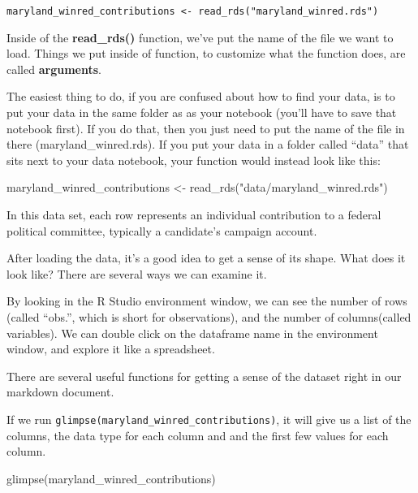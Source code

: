 \documentclass[
  letterpaper,
  DIV=11,
  numbers=noendperiod]{scrreprt}
\newenvironment{Shaded}{\begin{snugshade}}{\end{snugshade}}
\newcommand{\FunctionTok}[1]{\textcolor[rgb]{0.28,0.35,0.67}{#1}}
\newcommand{\NormalTok}[1]{\textcolor[rgb]{0.00,0.23,0.31}{#1}}
\newcommand{\OtherTok}[1]{\textcolor[rgb]{0.00,0.23,0.31}{#1}}
\newcommand{\StringTok}[1]{\textcolor[rgb]{0.13,0.47,0.30}{#1}}
\begin{document}
\texttt{maryland\_winred\_contributions\ \textless{}-\ read\_rds("maryland\_winred.rds")}

Inside of the \textbf{read\_rds()} function, we've put the name of the
file we want to load. Things we put inside of function, to customize
what the function does, are called \textbf{arguments}.

The easiest thing to do, if you are confused about how to find your
data, is to put your data in the same folder as as your notebook (you'll
have to save that notebook first). If you do that, then you just need to
put the name of the file in there (maryland\_winred.rds). If you put
your data in a folder called ``data'' that sits next to your data
notebook, your function would instead look like this:

\begin{Shaded}
\begin{Highlighting}[]
\NormalTok{maryland\_winred\_contributions }\OtherTok{\textless{}{-}} \FunctionTok{read\_rds}\NormalTok{(}\StringTok{"data/maryland\_winred.rds"}\NormalTok{)}
\end{Highlighting}
\end{Shaded}

In this data set, each row represents an individual contribution to a
federal political committee, typically a candidate's campaign account.

After loading the data, it's a good idea to get a sense of its shape.
What does it look like? There are several ways we can examine it.

By looking in the R Studio environment window, we can see the number of
rows (called ``obs.'', which is short for observations), and the number
of columns(called variables). We can double click on the dataframe name
in the environment window, and explore it like a spreadsheet.

There are several useful functions for getting a sense of the dataset
right in our markdown document.

If we run \texttt{glimpse(maryland\_winred\_contributions)}, it will
give us a list of the columns, the data type for each column and and the
first few values for each column.

\begin{Shaded}
\begin{Highlighting}[]
\FunctionTok{glimpse}\NormalTok{(maryland\_winred\_contributions)}
\end{Highlighting}
\end{Shaded}
\end{document}

